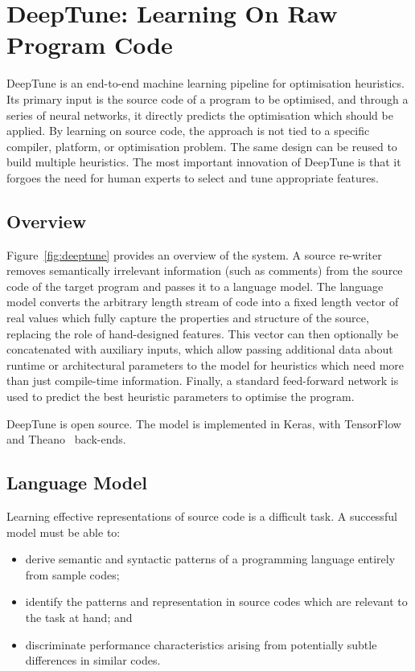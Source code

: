 \section{DeepTune: Learning On Raw Program Code}%
\label{sec:deeptune}

DeepTune is an end-to-end machine learning pipeline for optimisation heuristics. Its primary input is the source code of a program to be optimised, and through a series of neural networks, it directly predicts the optimisation which should be applied. By learning on source code, the approach is not tied to a specific compiler, platform, or optimisation problem. The same design can be reused to build multiple heuristics. The most important innovation of DeepTune is that it forgoes the need for human experts to select and tune appropriate features.


\subsection{Overview}

Figure~\ref{fig:deeptune} provides an overview of the system. A source re-writer removes semantically irrelevant information (such as comments) from the source code of the target program and passes it to a language model. The language model converts the arbitrary length stream of code into a fixed length vector of real values which fully capture the properties and structure of the source, replacing the role of hand-designed features. This vector can then optionally be concatenated with auxiliary inputs, which allow passing additional data about runtime or architectural parameters to the model for heuristics which need more than just compile-time information. Finally, a standard feed-forward network is used to predict the best heuristic parameters to optimise the program.



DeepTune is open source. The model is implemented in Keras, with TensorFlow~\cite{Abadi} and Theano~\cite{Bergstra2011} back-ends.


\subsection{Language Model}

Learning effective representations of source code is a difficult task. A successful model must be able to:

\begin{itemize}
  \item derive semantic and syntactic patterns of a programming language entirely from sample codes;
  \item identify the patterns and representation in source codes which are relevant to the task at hand; and
  \item discriminate performance characteristics arising from potentially subtle differences in similar codes.
\end{itemize}

